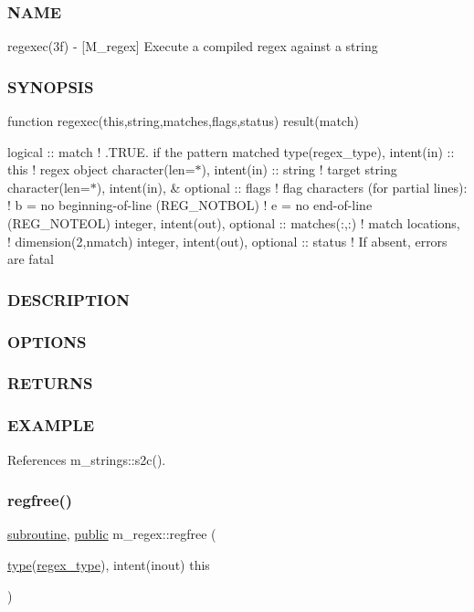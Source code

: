 \subsubsection*{N\+A\+ME}

regexec(3f) -\/ \mbox{[}M\+\_\+regex\mbox{]} Execute a compiled regex against a string \subsubsection*{S\+Y\+N\+O\+P\+S\+IS}

function regexec(this,string,matches,flags,status) result(match)

logical \+:\+: match ! .T\+R\+UE. if the pattern matched type(regex\+\_\+type), intent(in) \+:\+: this ! regex object character(len=$\ast$), intent(in) \+:\+: string ! target string character(len=$\ast$), intent(in), \& optional \+:\+: flags ! flag characters (for partial lines)\+: ! b = no beginning-\/of-\/line (R\+E\+G\+\_\+\+N\+O\+T\+B\+OL) ! e = no end-\/of-\/line (R\+E\+G\+\_\+\+N\+O\+T\+E\+OL) integer, intent(out), optional \+:\+: matches(\+:,\+:) ! match locations, ! dimension(2,nmatch) integer, intent(out), optional \+:\+: status ! If absent, errors are fatal \subsubsection*{D\+E\+S\+C\+R\+I\+P\+T\+I\+ON}

\subsubsection*{O\+P\+T\+I\+O\+NS}

\subsubsection*{R\+E\+T\+U\+R\+NS}

\subsubsection*{E\+X\+A\+M\+P\+LE}

References m\+\_\+strings\+::s2c().

\mbox{\label{namespacem__regex_a4e4e0028bd3eddc7b2444e90a2129b9e}} 
\subsubsection{\texorpdfstring{regfree()}{regfree()}}
{\footnotesize\ttfamily \hyperlink{M__stopwatch_83_8txt_acfbcff50169d691ff02d4a123ed70482}{subroutine}, \hyperlink{M__stopwatch_83_8txt_a2f74811300c361e53b430611a7d1769f}{public} m\+\_\+regex\+::regfree (\begin{DoxyParamCaption}\item[{\hyperlink{stop__watch_83_8txt_a70f0ead91c32e25323c03265aa302c1c}{type}(\hyperlink{structm__regex_1_1regex__type}{regex\+\_\+type}), intent(inout)}]{this }\end{DoxyParamCaption})}



